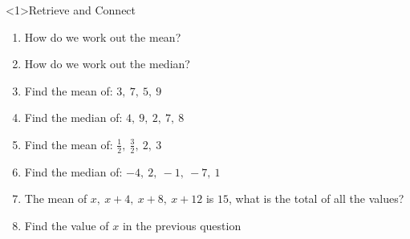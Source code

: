 \documentclass{beamer}
\newcommand{\ashow}[1]{\uncover<2->{\textcolor{red}{\small #1}}}
\newcommand{\ashowq}[1]{\alt<2->{\textcolor{red}{\small #1}}{?}}
\begin{document}
\begin{frame}<1>{Retrieve and Connect}
\vspace{-0.8em}

\footnotesize
\begin{enumerate}\itemsep2pt
  \item How do we work out the mean? \ashow{Add the values and divide by how many there are.}
  \item How do we work out the median? \ashow{Order the data and find the middle value.}
  \item Find the mean of: $3,\ 7,\ 5,\ 9$ \ashow{$=6$}
  \item Find the median of: $4,\ 9,\ 2,\ 7,\ 8$ \ashow{$=7$}
  \item Find the mean of: $\frac{1}{2},\ \frac{3}{2},\ 2,\ 3$ \ashow{$=\frac{7}{4}$}
  \item Find the median of: $-4,\ 2,\ -1,\ -7,\ 1$ \ashow{$=-1$}
  \item The mean of $x,\ x+4,\ x+8,\ x+12$ is $15$, what is the total of all the values? \ashow{$60$}
  \item Find the value of $x$ in the previous question \ashow{$x=9$}
\end{enumerate}

\end{frame}
\end{document}
